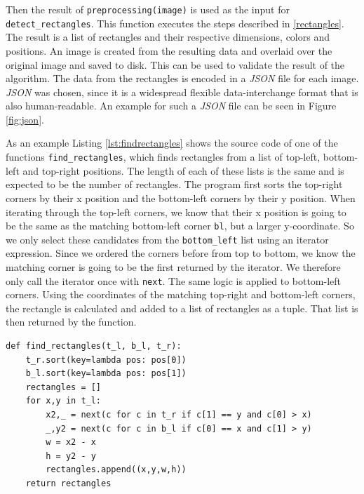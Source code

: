 \documentclass[serif,article,noparskip]{agse-thesis}
\begin{document}
Then the result of \texttt{preprocessing(image)} is used as the input for
\texttt{detect\_rectangles}. This function executes the steps described in
\ref{rectangles}. The result is a list of rectangles and their respective
dimensions, colors and positions. An image is created from the resulting data
and overlaid over the original image and saved to disk. This can be used to
validate the result of the algorithm. The data from the rectangles is encoded in
a \textit{JSON} file for each image. \textit{JSON} was chosen, since it is a
widespread flexible data-interchange format that is also human-readable. An
example for such a \textit{JSON} file can be seen in Figure \ref{fig:json}.


As an example Listing \ref{lst:findrectangles} shows the source code of
one of the functions \texttt{find\_rectangles}, which finds rectangles from a
list of top-left, bottom-left and top-right positions. The length of each of
these lists is the same and is expected to be the number of rectangles. The
program first sorts the top-right corners by their x position and the
bottom-left corners by their y position. When iterating through the top-left
corners, we know that their x position is going to be the same as the matching
bottom-left corner \texttt{bl}, but a larger y-coordinate. So we only select
these candidates from the \texttt{bottom\_left} list using an iterator
expression. Since we ordered the corners before from top to bottom, we know the
matching corner is going to be the first returned by the iterator. We therefore
only call the iterator once with \texttt{next}. The same logic is applied to
bottom-left corners. Using the coordinates of the matching top-right and
bottom-left corners, the rectangle is calculated and added to a list of
rectangles as a tuple. That list is then returned by the function.

\begin{minipage}{\linewidth}
\begin{lstlisting}[otherkeywords=def,label=lst:findrectangles,caption=Function for constructing rectangles from corners]
def find_rectangles(t_l, b_l, t_r):
    t_r.sort(key=lambda pos: pos[0])
    b_l.sort(key=lambda pos: pos[1])
    rectangles = []
    for x,y in t_l:
        x2,_ = next(c for c in t_r if c[1] == y and c[0] > x)
        _,y2 = next(c for c in b_l if c[0] == x and c[1] > y)
        w = x2 - x
        h = y2 - y
        rectangles.append((x,y,w,h))
    return rectangles
\end{lstlisting}
\end{minipage}
\end{document}
